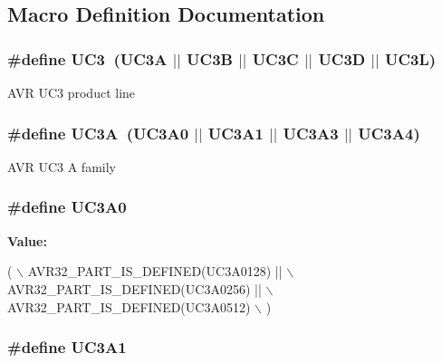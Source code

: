 \subsection{Macro Definition Documentation}
\hypertarget{group__uc3__part__macros__group_ga848d950beec67bc702bfcfdecc70bb5b}{
\subsubsection[{U\-C3}]{\setlength{\rightskip}{0pt plus 5cm}\#define U\-C3~({\bf U\-C3\-A} $|$$|$ {\bf U\-C3\-B} $|$$|$ {\bf U\-C3\-C} $|$$|$ {\bf U\-C3\-D} $|$$|$ {\bf U\-C3\-L})}}\label{group__uc3__part__macros__group_ga848d950beec67bc702bfcfdecc70bb5b}
A\-V\-R U\-C3 product line \hypertarget{group__uc3__part__macros__group_gaf7f16cc2bde7daf34576983fee8824c8}{
\subsubsection[{U\-C3\-A}]{\setlength{\rightskip}{0pt plus 5cm}\#define U\-C3\-A~({\bf U\-C3\-A0} $|$$|$ {\bf U\-C3\-A1} $|$$|$ {\bf U\-C3\-A3} $|$$|$ {\bf U\-C3\-A4})}}\label{group__uc3__part__macros__group_gaf7f16cc2bde7daf34576983fee8824c8}
A\-V\-R U\-C3 A family \hypertarget{group__uc3__part__macros__group_gaee4dd9ce50cc26707d159660db9fc408}{
\subsubsection[{U\-C3\-A0}]{\setlength{\rightskip}{0pt plus 5cm}\#define U\-C3\-A0}}\label{group__uc3__part__macros__group_gaee4dd9ce50cc26707d159660db9fc408}
{\bfseries Value\-:}
\begin{DoxyCode}
(   \(\backslash\)
        AVR32\_PART\_IS\_DEFINED(UC3A0128) || \(\backslash\)
        AVR32\_PART\_IS\_DEFINED(UC3A0256) || \(\backslash\)
        AVR32\_PART\_IS\_DEFINED(UC3A0512) \(\backslash\)
        )
\end{DoxyCode}
\hypertarget{group__uc3__part__macros__group_gacbe47eb7ac7d6e655d45657bffab3af6}{
\subsubsection[{U\-C3\-A1}]{\setlength{\rightskip}{0pt plus 5cm}\#define U\-C3\-A1}}\label{group__uc3__part__macros__group_gacbe47eb7ac7d6e655d45657bffab3af6}
